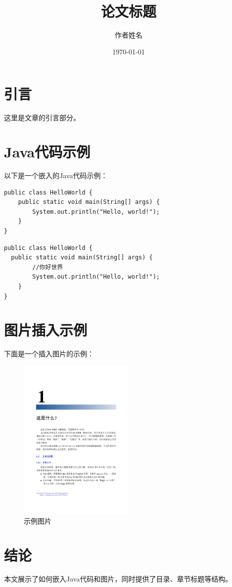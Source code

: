 \documentclass[12pt]{article}
\title{论文标题}
\author{作者姓名}
\date{\today}
\begin{document}
\maketitle

\tableofcontents
\newpage

\section{引言}
这里是文章的引言部分。

\section{Java代码示例}
以下是一个嵌入的Java代码示例：

\begin{lstlisting}[style=java, caption={HelloWorld.java}]
public class HelloWorld {
    public static void main(String[] args) {
        System.out.println("Hello, world!");
    }
}
\end{lstlisting}

\newpage
\begin{lstlisting}[style=java, caption={HelloWorld.java}]
public class HelloWorld {
  public static void main(String[] args) {
        //你好世界
        System.out.println("Hello, world!");
    }
}
\end{lstlisting}


\section{图片插入示例}
下面是一个插入图片的示例：

\begin{figure}[h]
    \centering
    \includegraphics[width=0.5\textwidth]{9.png} %
    \caption{示例图片}
    \label{fig:example}
\end{figure}

\section{结论}
本文展示了如何嵌入Java代码和图片，同时提供了目录、章节标题等结构。
\end{document}

